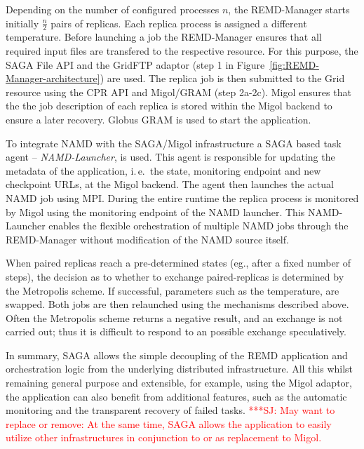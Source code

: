 \documentclass{rspublic}
\newcommand{\jhanote}[1]{ {\textcolor{red} { ***SJ: #1 }}}
\newcommand{\jhanote}[1]{}
\begin{document}

Depending on the number of configured processes $n$, the REMD-Manager
starts initially $\frac{n}{2}$ pairs of replicas.  Each replica
process is assigned a different temperature. Before launching a job
the REMD-Manager ensures that all required input files are transfered
to the respective resource. For this purpose, the SAGA File API and
the GridFTP adaptor (step 1 in
Figure~\ref{fig:REMD-Manager-architecture}) are used.  The replica job
is then submitted to the Grid resource using the CPR API and
Migol/GRAM (step 2a-2c). Migol ensures that the the job description of
each replica is stored within the Migol backend to ensure a later
recovery. Globus GRAM is used to start the application.
                                               
To integrate NAMD with the SAGA/Migol infrastructure a SAGA based task
agent -- {\it NAMD-Launcher}, is used.  This agent is responsible for
updating the metadata of the application, i.\,e.\ the state,
monitoring endpoint and new checkpoint URLs, at the
Migol backend.  The agent then launches the actual NAMD job using
MPI. During the entire runtime the replica process is monitored by
Migol using the monitoring endpoint of the NAMD launcher. This
NAMD-Launcher enables the flexible orchestration of multiple NAMD jobs
through the REMD-Manager without modification of the NAMD source
itself.


When paired replicas reach a pre-determined states (eg., after a fixed
number of steps), the decision as to whether to exchange
paired-replicas is determined by the Metropolis scheme. If successful,
parameters such as the temperature, are swapped. Both jobs are then
relaunched using the mechanisms described above. Often the Metropolis
scheme returns a negative result, and an exchange is not carried out;
thus it is difficult to respond to an possible exchange speculatively.

In summary, SAGA allows the simple decoupling of the REMD application
and orchestration logic from the underlying distributed
infrastructure. All this whilst remaining general purpose and
extensible, for example, using the Migol adaptor, the application can
also benefit from additional features, such as the automatic
monitoring and the transparent recovery of failed tasks.  \jhanote{May
  want to replace or remove: At the same time, SAGA allows the
  application to easily utilize other infrastructures in conjunction
  to or as replacement to Migol.}
\end{document}
